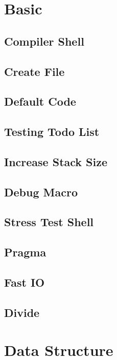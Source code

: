 \section{Basic}
\subsection{Compiler Shell}

\subsection{Create File}

\subsection{Default Code}

\subsection{Testing Todo List}

\subsection{Increase Stack Size}

\subsection{Debug Macro}

\subsection{Stress Test Shell}

\subsection{Pragma}

\subsection{Fast IO}

\subsection{Divide}


\section{Data Structure}
